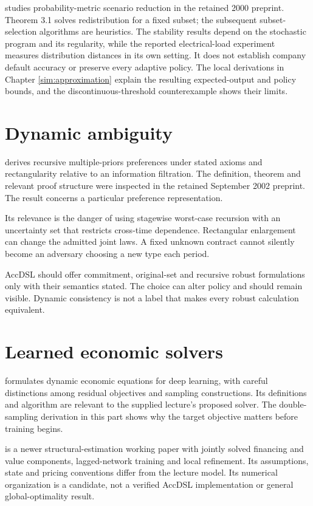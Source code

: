 \citet[Sections 2--4]{dupacova2000preprint} studies probability-metric scenario reduction in the retained 2000 preprint. Theorem 3.1 solves redistribution for a fixed subset; the subsequent subset-selection algorithms are heuristics. The stability results depend on the stochastic program and its regularity, while the reported electrical-load experiment measures distribution distances in its own setting. It does not establish company default accuracy or preserve every adaptive policy. The local derivations in Chapter \ref{sim:approximation} explain the resulting expected-output and policy bounds, and the discontinuous-threshold counterexample shows their limits.

\section{Dynamic ambiguity}
\citet{epstein2002preprint} derives recursive multiple-priors preferences under stated axioms and rectangularity relative to an information filtration. The definition, theorem and relevant proof structure were inspected in the retained September 2002 preprint. The result concerns a particular preference representation.

Its relevance is the danger of using stagewise worst-case recursion with an uncertainty set that restricts cross-time dependence. Rectangular enlargement can change the admitted joint laws. A fixed unknown contract cannot silently become an adversary choosing a new type each period.

AccDSL should offer commitment, original-set and recursive robust formulations only with their semantics stated. The choice can alter policy and should remain visible. Dynamic consistency is not a label that makes every robust calculation equivalent.

\section{Learned economic solvers}
\citet{maliar2021} formulates dynamic economic equations for deep learning, with careful distinctions among residual objectives and sampling constructions. Its definitions and algorithm are relevant to the supplied lecture's proposed solver. The double-sampling derivation in this part shows why the target objective matters before training begins.

\citet{duarte2026} is a newer structural-estimation working paper with jointly solved financing and value components, lagged-network training and local refinement. Its assumptions, state and pricing conventions differ from the lecture model. Its numerical organization is a candidate, not a verified AccDSL implementation or general global-optimality result.

